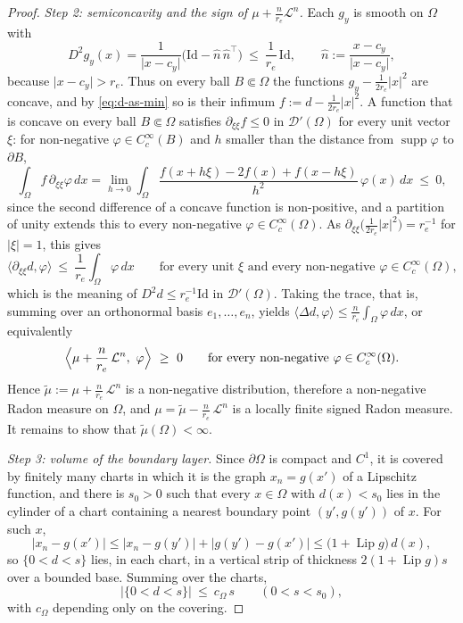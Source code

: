 \documentclass[10pt,a4paper]{amsart}
\newcommand{\abs}[1]{\lvert #1\rvert}
\begin{document}
\begin{proof}
\emph{Step 2: semiconcavity and the sign of $\mu+\frac n{r_e}\mathcal L^n$.}
Each $g_y$ is smooth on $\Omega$ with
\[
D^2g_y(x)=\frac{1}{\abs{x-c_y}}\bigl(\mathrm{Id}-\hat n\,\hat n^{\top}\bigr)
\ \le\ \frac1{r_e}\,\mathrm{Id},
\qquad \hat n:=\frac{x-c_y}{\abs{x-c_y}},
\]
because $\abs{x-c_y}>r_e$. Thus on every ball $B\Subset\Omega$ the functions
$g_y-\tfrac1{2r_e}\abs{x}^2$ are concave, and by \eqref{eq:d-as-min} so is
their infimum $f:=d-\tfrac1{2r_e}\abs{x}^2$. A function that is concave on
every ball $B\Subset\Omega$ satisfies $\partial_{\xi\xi}f\le0$ in
$\mathcal D'(\Omega)$ for every unit vector $\xi$: for non-negative
$\varphi\in C_c^\infty(B)$ and $h$ smaller than the distance from
$\operatorname{supp}\varphi$ to $\partial B$,
\[
\int_\Omega f\,\partial_{\xi\xi}\varphi\,dx
=\lim_{h\to0}\int_\Omega
\frac{f(x+h\xi)-2f(x)+f(x-h\xi)}{h^{2}}\,\varphi(x)\,dx\ \le\ 0,
\]
since the second difference of a concave function is non-positive, and a
partition of unity extends this to every non-negative
$\varphi\in C_c^\infty(\Omega)$. As $\partial_{\xi\xi}\bigl(\tfrac1{2r_e}\abs{x}^2\bigr)=r_e^{-1}$
for $\abs\xi=1$, this gives
\[
\langle\partial_{\xi\xi}d,\varphi\rangle\ \le\ \frac1{r_e}\int_\Omega\varphi\,dx
\qquad\text{for every unit }\xi\text{ and every non-negative }
\varphi\in C_c^\infty(\Omega),
\]
which is the meaning of $D^2d\le r_e^{-1}\mathrm{Id}$ in $\mathcal D'(\Omega)$.
Taking the trace, that is, summing over an orthonormal basis $e_1,\dots,e_n$,
yields $\langle\Delta d,\varphi\rangle\le\frac n{r_e}\int_\Omega\varphi\,dx$,
or equivalently
\[
\Bigl\langle\mu+\frac n{r_e}\,\mathcal L^n,\ \varphi\Bigr\rangle\ \ge\ 0
\qquad\text{for every non-negative }\varphi\in C_c^\infty(\Omega).
\]
Hence $\widetilde\mu:=\mu+\frac n{r_e}\,\mathcal L^n$ is a non-negative
distribution, therefore a non-negative Radon measure on $\Omega$, and
$\mu=\widetilde\mu-\frac n{r_e}\,\mathcal L^n$ is a locally finite signed Radon
measure. It remains to show that $\widetilde\mu(\Omega)<\infty$.

\emph{Step 3: volume of the boundary layer.}
Since $\partial\Omega$ is compact and $C^1$, it is covered by finitely many
charts in which it is the graph $x_n=g(x')$ of a Lipschitz function, and
there is $s_0>0$ such that every $x\in\Omega$ with $d(x)<s_0$ lies in the
cylinder of a chart containing a nearest boundary point $(y',g(y'))$ of $x$.
For such $x$,
\[
\abs{x_n-g(x')}\le\abs{x_n-g(y')}+\abs{g(y')-g(x')}
\le\bigl(1+\operatorname{Lip}g\bigr)\,d(x),
\]
so $\{0<d<s\}$ lies, in each chart, in a vertical strip of thickness
$2(1+\operatorname{Lip}g)s$ over a bounded base. Summing over the charts,
\begin{equation}\label{eq:layer}
\abs{\{0<d<s\}}\ \le\ c_\Omega\,s\qquad(0<s<s_0),
\end{equation}
with $c_\Omega$ depending only on the covering.


\end{proof}
\end{document}
